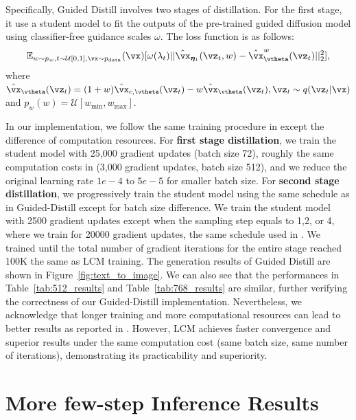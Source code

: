 \documentclass{article} %
\begin{document}
Specifically, Guided Distill involves two stages of distillation. For the first stage, it use a student model to fit the outputs of the pre-trained guided diffusion model using classifier-free guidance scales $\omega$. The loss function is as follows:
\begin{equation}
    \mathbb{E}_{w\sim p_w,t\sim \mathcal{U}[0,1],\vx\sim p_{\text{data}}}(\vx)[\omega(\lambda_t)||\hat{\vx}_{\bm{\eta}_1}(\vz_t,w)-\hat{\vx}_\vtheta^w(\vz_t)||_2^2],
\end{equation}
where $\hat{\vx}_\vtheta(\vz_t)=(1+w)\hat{\vx}_{c,\vtheta}(\vz_t)-w\hat{\vx}_\vtheta(\vz_t),\vz_t\sim q(\vz_t|\vx)$ and $p_w(w)=\mathcal{U}[w_{\text{min}},w_{\text{max}}]$. 

In our implementation, we follow the same training procedure in \citep{meng2023distillation} except the difference of computation resources. For \textbf{first stage distillation}, we train the student model with 25,000 gradient updates (batch size 72), roughly the same computation costs in \citep{meng2023distillation} (3,000 gradient updates, batch size 512), and we reduce the original learning rate $1e-4$ to $5e-5$ for smaller batch size. For \textbf{second stage distillation}, we progressively train the student model using the same schedule as in Guided-Distill \citep{meng2023distillation} except for batch size difference.  We train the student model with 2500 gradient updates except when the sampling step equals to 1,2, or 4, where we train for 20000 gradient updates, the same schedule used in \citep{meng2023distillation}. We trained until the total number of gradient iterations for the entire stage reached 100K the same as LCM training. The generation results of Guided Distill are shown in Figure~\ref{fig:text_to_image}.
We can also see that the performances in Table~\ref{tab:512_results} and Table~\ref{tab:768_results} are similar, further verifying the correctness of our Guided-Distill implementation. Nevertheless, we acknowledge that longer training and more computational resources can lead to better results as reported in \citep{meng2023distillation}. However, LCM achieves faster convergence and superior results under the same computation cost (same batch size, same number of iterations), demonstrating its practicability and superiority.

\section{More few-step Inference Results \label{appendix:more_results}}
\end{document}
